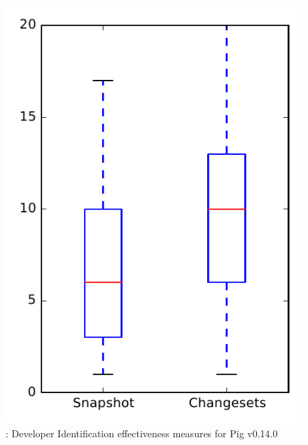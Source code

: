 
\begin{figure}
\centering
\includegraphics[height=0.4\textheight]{figures/dit/rq1_pig_no_outlier}
\caption{\done: Developer Identification effectiveness measures for Pig v0.14.0}
\label{fig:dit:rq1:pig}
\end{figure}
